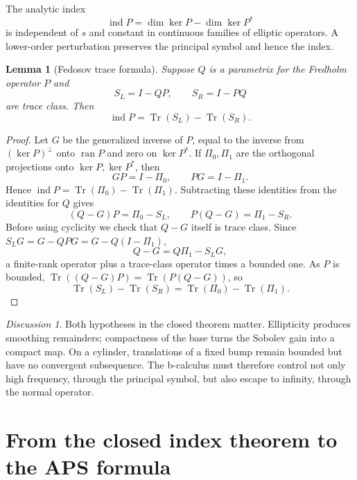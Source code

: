 \documentclass[12pt,oneside,reqno]{article}
\DeclareMathOperator{\Tr}{Tr}
\theoremstyle{plain}
\newtheorem{lemma}[theorem]{Lemma}
\theoremstyle{definition}
\theoremstyle{remark}
\newtheorem*{discussion}{Discussion}
\begin{document}
The analytic index
\[
 \operatorname{ind}P=\dim\ker P-\dim\ker P^*
\]
is independent of \(s\) and constant in continuous families of elliptic
operators. A lower-order perturbation preserves the principal symbol and
hence the index.

\begin{lemma}[Fedosov trace formula]
Suppose \(Q\) is a parametrix for the Fredholm operator \(P\) and
\[
 S_L=I-QP,\qquad S_R=I-PQ
\]
are trace class. Then
\[
 \operatorname{ind}P=\Tr(S_L)-\Tr(S_R).
\]
\end{lemma}

\begin{proof}
Let \(G\) be the generalized inverse of \(P\), equal to the inverse from
\((\ker P)^\perp\) onto \(\operatorname{ran}P\) and zero on
\(\ker P^*\). If \(\Pi_0,\Pi_1\) are the orthogonal projections onto
\(\ker P,\ker P^*\), then
\[
 GP=I-\Pi_0,\qquad PG=I-\Pi_1.
\]
Hence
\(\operatorname{ind}P=\Tr(\Pi_0)-\Tr(\Pi_1)\).
Subtracting these identities from the identities for \(Q\) gives
\[
 (Q-G)P=\Pi_0-S_L,\qquad P(Q-G)=\Pi_1-S_R.
\]
Before using cyclicity we check that \(Q-G\) itself is trace class.
Since \(S_LG=G-QPG=G-Q(I-\Pi_1)\),
\[
 Q-G=Q\Pi_1-S_LG,
\]
a finite-rank operator plus a trace-class operator times a bounded one.
As \(P\) is bounded, \(\Tr((Q-G)P)=\Tr(P(Q-G))\), so
\[
 \Tr(S_L)-\Tr(S_R)
 =\Tr(\Pi_0)-\Tr(\Pi_1).
\]
\end{proof}

\begin{discussion}
Both hypotheses in the closed theorem matter. Ellipticity produces
smoothing remainders; compactness of the base turns the Sobolev gain into
a compact map. On a cylinder, translations of a fixed bump remain bounded
but have no convergent subsequence. The b-calculus must therefore control
not only high frequency, through the principal symbol, but also escape to
infinity, through the normal operator.
\end{discussion}

\section{From the closed index theorem to the APS formula}
\label{sec:closed-to-APS}
\end{document}
